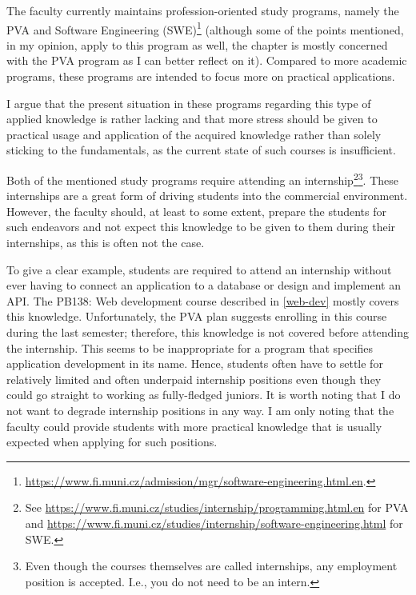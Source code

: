 \documentclass[
  digital,
  color,
  oneside,
  nosansbold,
  nocolorbold,
  nolof,
  nolot,
]{fithesis4}
\begin{document}
The faculty currently maintains profession-oriented study programs, namely the PVA and Software Engineering (SWE)\footnote{\url{https://www.fi.muni.cz/admission/mgr/software-engineering.html.en}.} (although some of the points mentioned, in my opinion, apply to this program as well, the chapter is mostly concerned with the PVA program as I can better reflect on it). Compared to more academic programs, these programs are intended to focus more on practical applications.

I argue that the present situation in these programs regarding this type of applied knowledge is rather lacking and that more stress should be given to practical usage and application of the acquired knowledge rather than solely sticking to the fundamentals, as the current state of such courses is insufficient.

Both of the mentioned study programs require attending an internship\footnote{See \url{https://www.fi.muni.cz/studies/internship/programming.html.en} for PVA and \url{https://www.fi.muni.cz/studies/internship/software-engineering.html} for SWE.}\footnote{Even though the courses themselves are called internships, any employment position is accepted. I.e., you do not need to be an intern.}. These internships are a great form of driving students into the commercial environment. However, the faculty should, at least to some extent, prepare the students for such endeavors and not expect this knowledge to be given to them during their internships, as this is often not the case. 

To give a clear example, students are required to attend an internship without ever having to connect an application to a database or design and implement an API. The PB138: Web development course described in \cref{web-dev} mostly covers this knowledge. Unfortunately, the PVA plan suggests enrolling in this course during the last semester; therefore, this knowledge is not covered before attending the internship. This seems to be inappropriate for a program that specifies application development in its name. Hence, students often have to settle for relatively limited and often underpaid internship positions even though they could go straight to working as fully-fledged juniors. It is worth noting that I do not want to degrade internship positions in any way. I am only noting that the faculty could provide students with more practical knowledge that is usually expected when applying for such positions.
\end{document}
